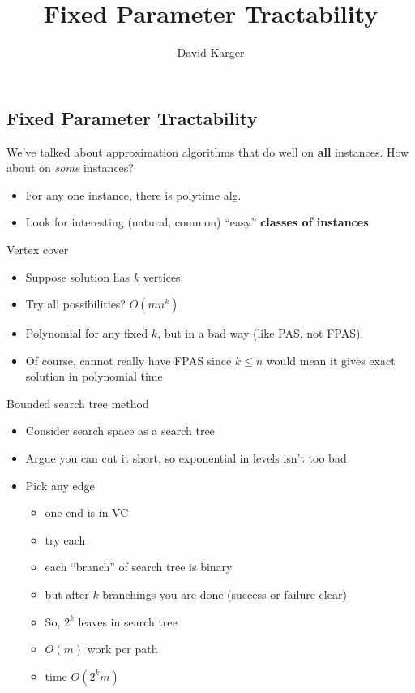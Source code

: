 \documentclass{article}
\title{Fixed Parameter Tractability}
\author{David Karger}
\begin{document}
\subsection{Fixed Parameter Tractability}

We've talked about approximation algorithms that do well on \textbf{all}
instances.  How about on \emph{some} instances?
\begin{itemize}
\item For any one instance, there is polytime alg.
\item Look for interesting (natural, common) ``easy'' \bf{classes} of
instances
\end{itemize}

Vertex cover
\begin{itemize}
\item Suppose solution has $k$ vertices
\item Try all possibilities?  $O(mn^k)$
\item Polynomial for any fixed $k$, but in a bad way (like PAS, not
  FPAS).
\item Of course, cannot really have FPAS since $k \leq n$ would mean it
  gives exact solution in polynomial time
\end{itemize}

Bounded search tree method
\begin{itemize}
\item Consider search space as a search tree
\item Argue you can cut it short, so exponential in levels isn't too bad
\item Pick any edge
\begin{itemize}
\item one end is in VC
\item try each
\item each ``branch'' of search tree is binary
\item but after $k$ branchings you are done (success or failure clear)
\item So, $2^k$ leaves in search tree
\item $O(m)$ work per path
\item time $O(2^k m)$
\end{itemize}
\end{itemize}
\end{document}
